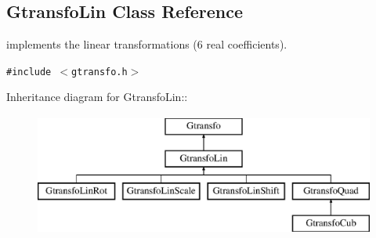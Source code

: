 \subsection{Gtransfo\-Lin  Class Reference}
\label{class_gtransfolin}
implements the linear transformations (6 real coefficients). 


{\tt \#include $<$gtransfo.h$>$}

Inheritance diagram for Gtransfo\-Lin::\begin{figure}[H]
\begin{center}
\leavevmode
\includegraphics[height=4cm]{class_gtransfolin}
\end{center}
\end{figure}

